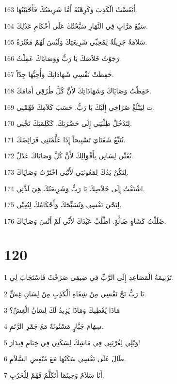 \par 163 أَبْغَضْتُ الْكَذِبَ وَكَرِهْتُهُ أَمَّا شَرِيعَتُكَ فَأَحْبَبْتُهَا.
\par 164 سَبْعَ مَرَّاتٍ فِي النَّهَارِ سَبَّحْتُكَ عَلَى أَحْكَامِ عَدْلِكَ.
\par 165 سَلاَمَةٌ جَزِيلَةٌ لِمُحِبِّي شَرِيعَتِكَ وَلَيْسَ لَهُمْ مَعْثَرَةٌ.
\par 166 رَجَوْتُ خَلاَصَكَ يَا رَبُّ وَوَصَايَاكَ عَمِلْتُ.
\par 167 حَفِظَتْ نَفْسِي شَهَادَاتِكَ وَأُحِبُّهَا جِدّاً.
\par 168 حَفِظْتُ وَصَايَاكَ وَشَهَادَاتِكَ لأَنَّ كُلَّ طُرُقِي أَمَامَكَ.
\par 169 ت لِيَبْلُغْ صُرَاخِي إِلَيْكَ يَا رَبُّ. حَسَبَ كَلاَمِكَ فَهِّمْنِي.
\par 170 لِتَدْخُلْ طِلْبَتِي إِلَى حَضْرَتِكَ. كَكَلِمَتِكَ نَجِّنِي.
\par 171 تُنَبِّعُ شَفَتَايَ تَسْبِيحاً إِذَا عَلَّمْتَنِي فَرَائِضَكَ.
\par 172 يُغَنِّي لِسَانِي بِأَقْوَالِكَ لأَنَّ كُلَّ وَصَايَاكَ عَدْلٌ.
\par 173 لِتَكُنْ يَدُكَ لِمَعُونَتِي لأَنَّنِي اخْتَرْتُ وَصَايَاكَ.
\par 174 اشْتَقْتُ إِلَى خَلاَصِكَ يَا رَبُّ وَشَرِيعَتُكَ هِيَ لَذَّتِي.
\par 175 لِتَحْيَ نَفْسِي وَتُسَبِّحَكَ وَأَحْكَامُكَ لِتُعِنِّي.
\par 176 ضَلَلْتُ كَشَاةٍ ضَالَّةٍ. اطْلُبْ عَبْدَكَ لأَنِّي لَمْ أَنْسَ وَصَايَاكَ.

\chapter{120}

\par 1 تَرْنِيمَةُ الْمَصَاعِدِ إِلَى الرَّبِّ فِي ضِيقِي صَرَخْتُ فَاسْتَجَابَ لِي.
\par 2 يَا رَبُّ نَجِّ نَفْسِي مِنْ شِفَاهِ الْكَذِبِ مِنْ لِسَانِ غِشٍّ.
\par 3 مَاذَا يُعْطِيكَ وَمَاذَا يَزِيدُ لَكَ لِسَانُ الْغِشِّ؟
\par 4 سِهَامَ جَبَّارٍ مَسْنُونَةً مَعَ جَمْرِ الرَّتَمِ.
\par 5 وَيْلِي لِغُرْبَتِي فِي مَاشِكَ لِسَكَنِي فِي خِيَامِ قِيدَارَ!
\par 6 طَالَ عَلَى نَفْسِي سَكَنُهَا مَعَ مُبْغِضِ السَّلاَمِ.
\par 7 أَنَا سَلاَمٌ وَحِينَمَا أَتَكَلَّمُ فَهُمْ لِلْحَرْبِ.

